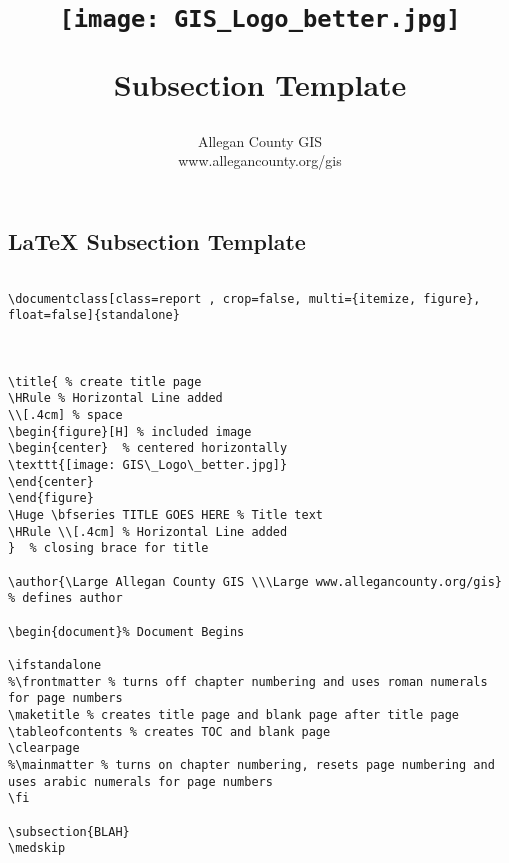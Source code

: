 \documentclass[class=book , crop=false]{standalone}
\title{ %
\HRule %
\\[.4cm] %
\begin{figure}[H] %
\begin{center}	%
\texttt{[image: GIS\_Logo\_better.jpg]}
\end{center}
\end{figure}
\Huge \bfseries Subsection Template %
\HRule \\[.4cm] %
}  %
\author{\Large Allegan County GIS \\\Large www.allegancounty.org/gis} %
\begin{document}

\ifstandalone
\maketitle %
\clearpage
\fi

\subsection{\LaTeX{} Subsection Template}
\medskip 
	
\begin{verbatim}

\documentclass[class=report , crop=false, multi={itemize, figure}, float=false]{standalone}



\title{ % create title page
\HRule % Horizontal Line added
\\[.4cm] % space
\begin{figure}[H] % included image
\begin{center}	% centered horizontally
\texttt{[image: GIS\_Logo\_better.jpg]}
\end{center}
\end{figure}
\Huge \bfseries TITLE GOES HERE % Title text
\HRule \\[.4cm] % Horizontal Line added
}  % closing brace for title

\author{\Large Allegan County GIS \\\Large www.allegancounty.org/gis} % defines author

\begin{document}% Document Begins

\ifstandalone
%\frontmatter % turns off chapter numbering and uses roman numerals for page numbers
\maketitle % creates title page and blank page after title page
\tableofcontents % creates TOC and blank page
\clearpage
%\mainmatter % turns on chapter numbering, resets page numbering and uses arabic numerals for page numbers
\fi

\subsection{BLAH}
\medskip 

\end{verbatim}
\end{document}
